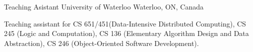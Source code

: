 

\begin{cventries}

   \cventry
    {Teaching Asistant} %
    {University of Waterloo} %
    {Waterloo, ON, Canada} %
    {} %
    {
      \begin{cvitems} %
      \item {Teaching assistant for CS 651/451(Data-Intensive Distributed Computing), CS 245 (Logic and Computation), CS 136 (Elementary Algorithm Design and Data Abstraction), CS 246 (Object-Oriented Software Development).}
      \end{cvitems}
    }
\end{cventries}

